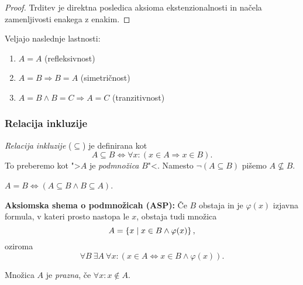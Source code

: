 \documentclass[12pt, a4paper]{article}
\renewcommand{\implies}{\Rightarrow}
\renewcommand{\iff}{\Leftrightarrow}
\begin{document}
\begin{proof}
Trditev je direktna posledica aksioma ekstenzionalnosti in načela zamenljivosti enakega z enakim.
\end{proof}

\begin{posledica}
Veljajo naslednje lastnosti:

\begin{enumerate}[label=(\roman*)]
\item $A=A$ (refleksivnost)
\item $A=B\implies B=A$ (simetričnost)
\item $A=B\land B=C\implies A=C$ (tranzitivnost)
\end{enumerate}
\end{posledica}

\obvs

\newpage

\subsubsection{Relacija inkluzije}

\begin{okvir}
\begin{definicija}
\emph{Relacija inkluzije} ($\subseteq$) je definirana kot
\[
A\subseteq B\iff\forall x\colon(x\in A\implies x\in B).
\]
To preberemo kot ">$A$ je \emph{podmnožica} $B$"<. Namesto $\neg(A\subseteq B)$ pišemo $A\not\subseteq B$.
\end{definicija}
\end{okvir}

\begin{trditev}
$A=B\iff(A\subseteq B\land B\subseteq A)$.
\end{trditev}

\obvs

\begin{okvir}
\textbf{Aksiomska shema o podmnožicah (ASP):} Če $B$ obstaja in je $\varphi(x)$ izjavna formula, v kateri prosto nastopa le $x$, obstaja tudi množica
\[
A=\left\{x\mid x\in B\land \varphi(x)\right\},
\]
oziroma
\[
\forall B~\exists A~\forall x\colon(x\in A\iff x\in B\land\varphi(x)).
\]
\end{okvir}

\begin{definicija}
Množica $A$ je \emph{prazna}, če $\forall x\colon x\not\in A$.
\end{definicija}
\end{document}
